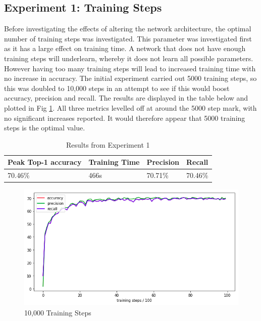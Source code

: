 \documentclass[12pt]{report}
\begin{document}
\begin{flushleft}
\vspace{0.5cm}
\section{Experiment 1: Training Steps}
Before investigating the effects of altering the network architecture, the optimal number of training steps was investigated. This parameter was investigated first as it has a large effect on training time. A network that does not have enough training steps will underlearn, whereby it does not learn all possible parameters. However having too many training steps will lead to increased training time with no increase in accuracy. The initial experiment carried out 5000 training steps, so this was doubled to 10,000 steps in an attempt to see if this would boost accuracy, precision and recall. The results are displayed in the table below and plotted in Fig \ref{fig:experiment-1}. All three metrics levelled off at around the 5000 step mark, with no significant increases reported. It would therefore appear that 5000 training steps is the optimal value.

\vspace{0.5cm}
\begin{table}[ht!]
\begin{tabular}{llll}
\\ \hline
\multicolumn{1}{|l|}{Peak Top-1 accuracy} & \multicolumn{1}{l|}{Training Time} & \multicolumn{1}{l|}{Precision} & \multicolumn{1}{l|}{Recall}  \\ \hline
\multicolumn{1}{|l|}{70.46\%}             & \multicolumn{1}{l|}{466s}          & \multicolumn{1}{l|}{70.71\%}   & \multicolumn{1}{l|}{70.46\%} \\ \hline
\end{tabular}
\caption{Results from Experiment 1}
\end{table}

\vspace{0.5cm}
\begin{figure}[ht!]
	\centering
	\includegraphics[width=12cm]{experiment-1}
	\caption{10,000 Training Steps}
	\label{fig:experiment-1}
\end{figure}
\end{flushleft}
\end{document}

